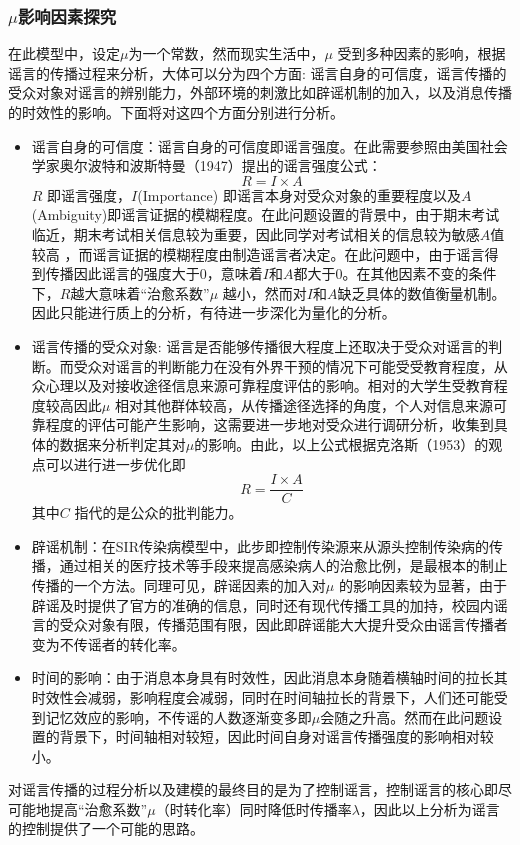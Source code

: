 \documentclass[withoutpreface,bwprint]{cumcmthesis}
\begin{document}
\subsubsection{$\mu$影响因素探究}

在此模型中，设定$\mu$为一个常数，然而现实生活中，$\mu$ 受到多种因素的影响，根据谣言的传播过程来分析，大体可以分为四个方面: 谣言自身的可信度，谣言传播的受众对象对谣言的辨别能力，外部环境的刺激比如辟谣机制的加入，以及消息传播的时效性的影响。下面将对这四个方面分别进行分析。
\begin{itemize}
	\item 谣言自身的可信度：谣言自身的可信度即谣言强度。在此需要参照由美国社会学家奥尔波特和波斯特曼（1947）提出的谣言强度公式\cite{ref4}：
	\[R=I \times A\]
	$R$ 即谣言强度，$I$(Importance) 即谣言本身对受众对象的重要程度以及$A$(Ambiguity)即谣言证据的模糊程度。在此问题设置的背景中，由于期末考试临近，期末考试相关信息较为重要，因此同学对考试相关的信息较为敏感$A$值较高 ，而谣言证据的模糊程度由制造谣言者决定。在此问题中，由于谣言得到传播因此谣言的强度大于0，意味着$I$和$A$都大于0。在其他因素不变的条件下，$R$越大意味着“治愈系数”$\mu$ 越小，然而对$I$和$A$缺乏具体的数值衡量机制。因此只能进行质上的分析，有待进一步深化为量化的分析。
	\item 谣言传播的受众对象: 谣言是否能够传播很大程度上还取决于受众对谣言的判断。而受众对谣言的判断能力在没有外界干预的情况下可能受受教育程度，从众心理以及对接收途径信息来源可靠程度评估的影响。相对的大学生受教育程度较高因此$\mu$ 相对其他群体较高，从传播途径选择的角度，个人对信息来源可靠程度的评估可能产生影响，这需要进一步地对受众进行调研分析，收集到具体的数据来分析判定其对$\mu$的影响。由此，以上公式根据克洛斯（1953）的观点可以进行进一步优化即 \[R=\frac{I\times A}{C}\]\cite{ref4}其中$C$ 指代的是公众的批判能力。
	\item 辟谣机制：在SIR传染病模型中，此步即控制传染源来从源头控制传染病的传播，通过相关的医疗技术等手段来提高感染病人的治愈比例，是最根本的制止传播的一个方法。同理可见，辟谣因素的加入对$\mu$ 的影响因素较为显著，由于辟谣及时提供了官方的准确的信息，同时还有现代传播工具的加持，校园内谣言的受众对象有限，传播范围有限，因此即辟谣能大大提升受众由谣言传播者变为不传谣者的转化率。
	\item 时间的影响：由于消息本身具有时效性，因此消息本身随着横轴时间的拉长其时效性会减弱，影响程度会减弱，同时在时间轴拉长的背景下，人们还可能受到记忆效应的影响，不传谣的人数逐渐变多即$\mu$会随之升高。然而在此问题设置的背景下，时间轴相对较短，因此时间自身对谣言传播强度的影响相对较小。
\end{itemize}
对谣言传播的过程分析以及建模的最终目的是为了控制谣言，控制谣言的核心即尽可能地提高“治愈系数”$\mu$（时转化率）同时降低时传播率$\lambda$，因此以上分析为谣言的控制提供了一个可能的思路。
\end{document}

